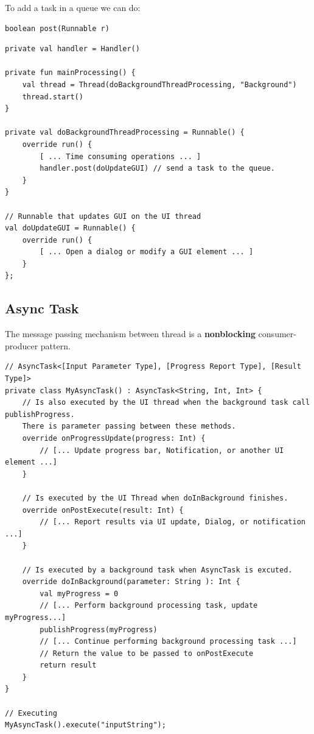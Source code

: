 To add a task in a queue we can do:
\begin{lstlisting}
boolean post(Runnable r)
\end{lstlisting}


\begin{lstlisting}[title=Post an no parameters]
private val handler = Handler()

private fun mainProcessing() { 
    val thread = Thread(doBackgroundThreadProcessing, "Background") 
    thread.start() 
} 
    
private val doBackgroundThreadProcessing = Runnable() {
    override run() { 
        [ ... Time consuming operations ... ]
        handler.post(doUpdateGUI) // send a task to the queue. 
    } 
}
    
// Runnable that updates GUI on the UI thread
val doUpdateGUI = Runnable() { 
    override run() { 
        [ ... Open a dialog or modify a GUI element ... ] 
    } 
};

\end{lstlisting}
\newpage
\subsection{Async Task}
The message passing mechanism between thread is a \textbf{nonblocking} consumer-producer pattern. 
\begin{lstlisting}[title=Creating and running Async tasks]
// AsyncTask<[Input Parameter Type], [Progress Report Type], [Result Type]>
private class MyAsyncTask() : AsyncTask<String, Int, Int> {
    // Is also executed by the UI thread when the background task call publishProgress.
    There is parameter passing between these methods. 
    override onProgressUpdate(progress: Int) {
        // [... Update progress bar, Notification, or another UI element ...]
    }

    // Is executed by the UI Thread when doInBackground finishes. 
    override onPostExecute(result: Int) {
        // [... Report results via UI update, Dialog, or notification ...]
    }

    // Is executed by a background task when AsyncTask is excuted.
    override doInBackground(parameter: String ): Int {
        val myProgress = 0
        // [... Perform background processing task, update myProgress...]
        publishProgress(myProgress)
        // [... Continue performing background processing task ...]
        // Return the value to be passed to onPostExecute
        return result
    }
}

// Executing 
MyAsyncTask().execute("inputString");
    
\end{lstlisting}











